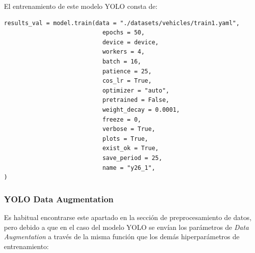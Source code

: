 \documentclass[12pt,a4paper,onecolumn,oneside]{report}
\begin{document}
El entrenamiento de este modelo YOLO consta de:

\begin{lstlisting}
results_val = model.train(data = "./datasets/vehicles/train1.yaml",
                            epochs = 50,
                            device = device,
                            workers = 4, 
                            batch = 16,
                            patience = 25,
                            cos_lr = True,
                            optimizer = "auto",
                            pretrained = False,
                            weight_decay = 0.0001,
                            freeze = 0,
                            verbose = True,
                            plots = True,
                            exist_ok = True,
                            save_period = 25,
                            name = "y26_1",
)
\end{lstlisting}

\subsubsection{YOLO Data Augmentation}

Es habitual encontrarse este apartado en la sección de preprocesamiento de datos, pero debido a que en el caso del modelo YOLO se envían los parámetros de \textit{Data Augmentation} a través de la misma función que los demás hiperparámetros de entrenamiento:
\end{document}
